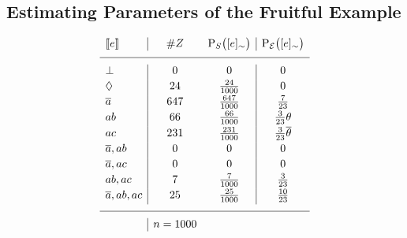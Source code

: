 \documentclass{tlp}
\newcommand{\at}[1]{\ensuremath{\!\del{#1}}}        %
\newcommand{\cla}[1]{\ensuremath{{\cal #1}}}        %
\newcommand{\co}[1]{\ensuremath{\overline{#1}}}     %
\newcommand{\EVENTSset}{\ensuremath{\cla{E}}}
\newcommand{\prfunc}{\ensuremath{\mathrm{P}}}
\newcommand{\prd}[1]{\ensuremath{\prfunc_{#1}}}
\newcommand{\prE}{\prd{\EVENTSset}}
\newcommand{\stablecore}[1]{\ensuremath{\left\llbracket #1 \right\rrbracket}}
\newcommand{\inconsistent}{\bot}
\newcommand{\indepclass}{\ensuremath{\Diamond}}
\newcommand{\class}[1]{\ensuremath{[{#1}]_{\sim}}}
\begin{document}
\subsection{Estimating Parameters of the Fruitful Example}\label{subsec:sbf.example}

\begin{table}[t]
    \begin{center}
        \[
            \begin{array}{l|cc|c}
                \stablecore{e}
                 & \#Z
                 & \prd{S}\at{\class{e}}
                 & \prE\at{\class{e}}
                \\
                \hline
                \inconsistent
                 & 0
                 & 0
                 & 0                       \\[2pt]
                \indepclass
                 & 24
                 & \frac{24}{1000}
                 & 0                       \\[2pt]
                \co{a}
                 & 647
                 & \frac{647}{1000}
                 & \frac{7}{23}
                \\[2pt]
                ab
                 & 66
                 & \frac{66}{1000}
                 & \frac{3}{23}\theta      \\[2pt]
                ac
                 & 231
                 & \frac{231}{1000}
                 & \frac{3}{23}\co{\theta}
                \\[2pt]
                \co{a}, ab
                 & 0
                 & 0
                 & 0                       \\[2pt]
                \co{a}, ac
                 & 0
                 & 0
                 & 0
                \\[2pt]
                ab, ac
                 & 7
                 & \frac{7}{1000}
                 & \frac{3}{23}
                \\[2pt]
                \co{a}, ab, ac
                 & 25
                 & \frac{25}{1000}
                 & \frac{10}{23}
                \\[2pt]
                \hline
                 & n = 1000\end{array}
        \]
    \end{center}

    \caption{\emph{Experiment 1: Bias to \(ac\).} Results from an 
    experiment where \(n=1000\) samples where generated following 
    the \emph{Model+Noise} procedure with parameters 
    \(\alpha = 0.1, \beta = 0.3, \gamma = 0.2\).  
    Column \(\#Z\) lists the number of observations on each class, 
    the \emph{empirical} distribution is represented by \(\prd{S}\) 
    and the \emph{prior}, as before, is denoted by \(\prE\).}
    \label{tab:sbf.example}
\end{table}
\end{document}
